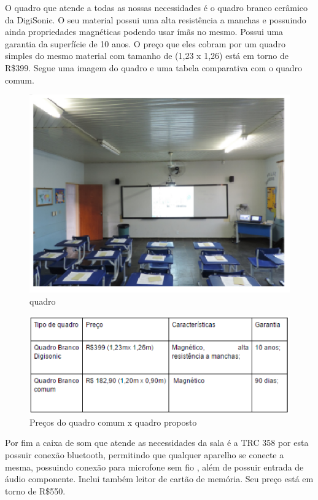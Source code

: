 O quadro que atende a todas as nossas necessidades é o quadro branco cerâmico da DigiSonic. O seu material possui uma alta resistência a manchas e possuindo ainda propriedades magnéticas podendo usar ímãs no mesmo. Possui uma garantia da superfície de 10 anos. O preço que eles cobram por um quadro simples do mesmo material com tamanho de (1,23 x 1,26) está em torno de R\$399. Segue uma imagem do quadro e uma tabela comparativa com o quadro comum.

\begin{figure}[!ht]
\centering
\includegraphics[keepaspectratio=true,scale=1]{figuras/quadro.eps}
\caption{quadro}
\end{figure}

\begin{figure}[!ht]
\centering
\includegraphics[keepaspectratio=true,scale=1]{figuras/comparativo_precos_quadros.eps}
\caption{Preços do quadro comum x quadro proposto}
\end{figure}

Por fim a caixa de som que atende as necessidades da sala é a TRC 358 por esta possuir conexão bluetooth, permitindo que qualquer aparelho se conecte a mesma, possuindo conexão para microfone sem fio , além de possuir entrada de áudio componente. Inclui também leitor de cartão de memória. Seu preço está em torno de R\$550.

